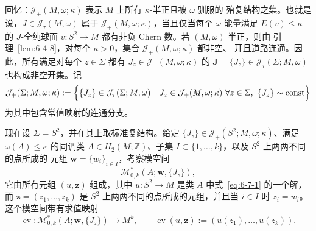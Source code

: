 回忆：$\mathcal J_+(M,\omega;\kappa)$ 表示 $M$ 上所有 $\kappa$-半正且被 $\omega$ 驯服的
殆复结构之集。也就是说，$J\in\mathcal J_\tau(M,\omega)$ 属于
$\mathcal J_+(M,\omega;\kappa)$，当且仅当每个 $\omega$-能量满足 $E(v)\le\kappa$ 的
$J$-全纯球面 $v:S^2\to M$ 都有非负 Chern 数。若 $(M,\omega)$ 半正，则由
引理~\ref{lem:6-4-8}，对每个 $\kappa>0$，集合 $\mathcal J_+(M,\omega;\kappa)$ 都非空、
开且道路连通。因此，所有满足对每个 $z\in\Sigma$ 都有
$J_z\in\mathcal J_+(M,\omega;\kappa)$ 的
$\mathbf J=\{J_z\}\in\mathcal J_\tau(\Sigma;M,\omega)$ 也构成非空开集。记
\[
  \mathcal J_+(\Sigma;M,\omega;\kappa)
  :=\Bigl\{\{J_z\}\in\mathcal J_\tau(\Sigma;M,\omega)\ \Big|\
      J_z\in\mathcal J_+(M,\omega;\kappa)\ \forall z\in\Sigma,
      \ \{J_z\}\sim\mathrm{const}\Bigr\}
\]
为其中包含常值映射的连通分支。

现在设 $\Sigma=S^2$，并在其上取标准复结构。给定
$\{J_z\}\in\mathcal J_+(S^2;M,\omega;\kappa)$、满足 $\omega(A)\le\kappa$ 的同调类
$A\in H_2(M;\mathbb Z)$、子集 $I\subset\{1,\ldots,k\}$，以及 $S^2$ 上两两不同的点所成的
元组 $\mathbf w=\{w_i\}_{i\in I}$，考察\BookRecordIndex{T0246}模空间
\[
  \mathcal M^*_{0,k}(A;\mathbf w,\{J_z\}),
\]
它由所有元组 $(u,\mathbf z)$ 组成，其中 $u:S^2\to M$ 是类 $A$ 中式~\eqref{eq:6-7-1}
的一个解，而 $\mathbf z=(z_1,\ldots,z_k)$ 是 $S^2$ 上两两不同的点所成的元组，并且当
$i\in I$ 时 $z_i=w_i$。这个模空间带有求值映射
\begin{equation}\label{eq:6-7-2}
  \operatorname{ev}:\mathcal M^*_{0,k}(A;\mathbf w,\{J_z\})\longrightarrow M^k,
  \qquad
  \operatorname{ev}(u,\mathbf z):=(u(z_1),\ldots,u(z_k)).
\end{equation}


